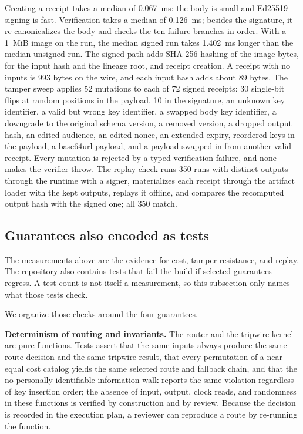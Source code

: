 \documentclass[conference]{IEEEtran}
\begin{document}
Creating a receipt takes a median of 0.067~ms: the body is small and Ed25519
signing is fast. Verification takes a median of 0.126~ms; besides the signature, it
re-canonicalizes the body and checks the ten failure branches in order. With a 1~MiB image
on the run, the median signed run takes 1.402~ms longer than the median unsigned run.
The signed path adds SHA-256 hashing of the image bytes, for the input hash and the
lineage root, and receipt creation. A receipt with no inputs is 993 bytes on the wire, and each
input hash adds about 89 bytes. The tamper sweep applies 52 mutations to each of
72 signed receipts: 30 single-bit flips at random positions in the payload, 10 in the signature, an unknown key identifier, a valid but wrong key identifier, a swapped body key identifier, a downgrade to the original schema version, a removed version, a dropped output hash, an edited audience, an edited nonce, an extended expiry, reordered keys in the payload, a base64url payload, and a payload swapped in from another valid receipt.
Every mutation is rejected by a typed verification failure, and none makes the verifier throw. The replay check runs 350 runs with distinct outputs through the
runtime with a signer, materializes each receipt through the artifact loader with the
kept outputs, replays it offline, and compares the recomputed output hash with the signed
one; all 350 match.

\subsection{Guarantees also encoded as tests}

The measurements above are the evidence for cost, tamper resistance, and replay.
The repository also contains tests that fail the build if selected guarantees regress.
A test count is not itself a measurement, so this subsection only names what those
tests check.



We organize those checks around the four guarantees.

\textbf{Determinism of routing and invariants.} The router and the tripwire kernel are
pure functions. Tests assert that the same inputs always produce the same route
decision and the same tripwire result, that every permutation of a near-equal cost
catalog yields the same selected route and fallback chain, and that the no personally
identifiable information walk reports the same violation regardless of key insertion
order; the absence of input, output, clock reads, and randomness in these functions is
verified by construction and by review. Because the decision is recorded in the
execution plan, a reviewer can reproduce a route by re-running the function.
\end{document}
